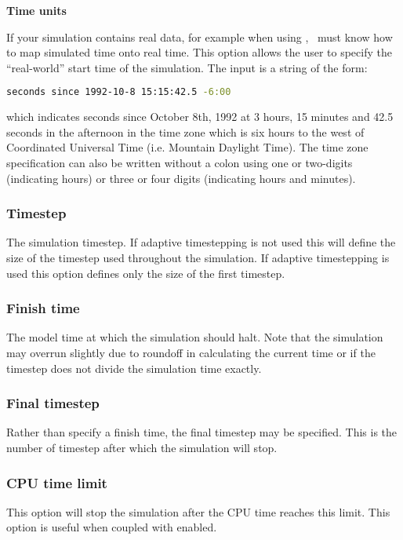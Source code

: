 \textbf{Time units}

If your simulation contains real data, for example when using
, \fluidity\ must know how to map simulated time onto
real time. This option allows the user to specify the ``real-world'' start
time of the simulation.  The input is a string of the form:
\begin{lstlisting}[language=bash]
seconds since 1992-10-8 15:15:42.5 -6:00 
\end{lstlisting} 

which indicates seconds since October 8th, 1992 at 3 hours, 15 minutes and
42.5 seconds in the afternoon in the time zone which is six hours to the
west of Coordinated Universal Time (i.e. Mountain Daylight Time). The time
zone specification can also be written without a colon using one or
two-digits (indicating hours) or three or four digits (indicating hours and
minutes).


\subsubsection{Timestep}
The simulation timestep. If adaptive timestepping is not used this will
define the size of the timestep used throughout the simulation.  If adaptive
timestepping is used this option defines only the size of the first
timestep.

\subsubsection{Finish time}
The model time at which the simulation should halt. Note that the simulation
may overrun slightly due to roundoff in calculating the current time or if
the timestep does not divide the simulation time exactly.

\subsubsection{Final timestep}

Rather than specify a finish time, the final timestep may be specified. This is the number of timestep after which the simulation will stop.

\subsubsection{CPU time limit}

This option will stop the simulation after the CPU time reaches this limit.
This option is useful when coupled with
 enabled.

